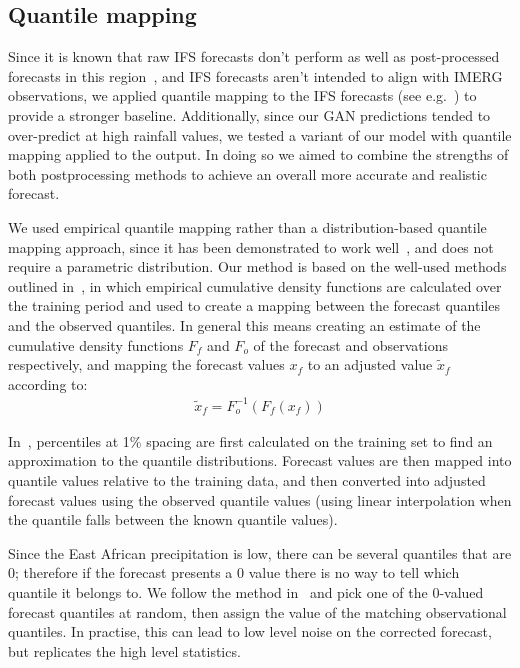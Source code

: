 \documentclass{article}
\begin{document}
\subsection{Quantile mapping}
\label{subsec:qm}
Since it is known that raw IFS forecasts don't perform as well as post-processed forecasts in this region~\citep{vogel_skill_2018}, and IFS forecasts aren't intended to align with IMERG observations, we applied quantile mapping to the IFS forecasts (see e.g.~\cite{maraun_model_2017}) to provide a stronger baseline. Additionally, since our GAN predictions tended to over-predict at high rainfall values, we tested a variant of our model with quantile mapping applied to the output. In doing so we aimed to combine the strengths of both postprocessing methods to achieve an overall more accurate and realistic forecast. 


We used empirical quantile mapping rather than a distribution-based quantile mapping approach, since it has been demonstrated to work well~\citep{gudmundsson_quantile_2012}, and does not require a parametric distribution. Our method is based on the well-used methods outlined in~\cite{boe_statistical_2007, deque_frequency_2007, maraun_model_2017}, in which empirical cumulative density functions are calculated over the training period and used to create a mapping between the forecast quantiles and the observed quantiles. In general this means creating an estimate of the cumulative density functions $F_{f}$ and $F_{o}$ of the forecast and observations respectively, and mapping the forecast values $x_{f}$ to an adjusted value $\tilde{x}_f$ according to:
\begin{align}
    \tilde{x}_f = F^{-1}_o (F_f (x_f))
\end{align}

In~\cite{boe_statistical_2007}, percentiles at 1\% spacing are first calculated on the training set to find an approximation to the quantile distributions. Forecast values are then mapped into quantile values relative to the training data, and then converted into adjusted forecast values using the observed quantile values (using linear interpolation when the quantile falls between the known quantile values). 

Since the East African precipitation is low, there can be several quantiles that are 0; therefore if the forecast presents a 0 value there is no way to tell which quantile it belongs to. We follow the method in~\cite{boe_statistical_2007} and pick one of the 0-valued forecast quantiles at random, then assign the value of the matching observational quantiles. In practise, this can lead to low level noise on the corrected forecast, but replicates the high level statistics.
\end{document}
